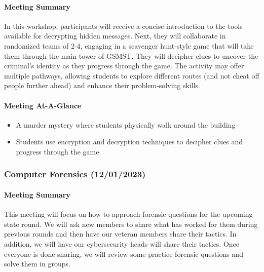 \documentclass[
  letterpaper,
  DIV=11,
  numbers=noendperiod]{scrartcl}
\let\oldparagraph\paragraph
\renewcommand{\paragraph}[1]{\oldparagraph{#1}\mbox{}}
\providecommand{\tightlist}{%
  \setlength{\itemsep}{0pt}\setlength{\parskip}{0pt}}\usepackage{longtable,booktabs,array}
\begin{document}
\hypertarget{meeting-summary-9}{%
\paragraph{Meeting Summary}\label{meeting-summary-9}}

In this workshop, participants will receive a concise introduction to
the tools available for decrypting hidden messages. Next, they will
collaborate in randomized teams of 2-4, engaging in a scavenger
hunt-style game that will take them through the main tower of GSMST.
They will decipher clues to uncover the criminal's identity as they
progress through the game. The activity may offer multiple pathways,
allowing students to explore different routes (and not cheat off people
further ahead) and enhance their problem-solving skills.

\hypertarget{meeting-at-a-glance-9}{%
\paragraph{Meeting At-A-Glance}\label{meeting-at-a-glance-9}}

\begin{itemize}
\tightlist
\item
  A murder mystery where students physically walk around the building
\item
  Students use encryption and decryption techniques to decipher clues
  and progress through the game
\end{itemize}

\newpage{}

\hypertarget{computer-forensics-12012023}{%
\subsubsection{Computer Forensics
(12/01/2023)}\label{computer-forensics-12012023}}

\hypertarget{meeting-summary-10}{%
\paragraph{Meeting Summary}\label{meeting-summary-10}}

This meeting will focus on how to approach forensic questions for the
upcoming state round. We will ask new members to share what has worked
for them during previous rounds and then have our veteran members share
their tactics. In addition, we will have our cybersecurity heads will
share their tactics. Once everyone is done sharing, we will review some
practice forensic questions and solve them in groups.
\end{document}
